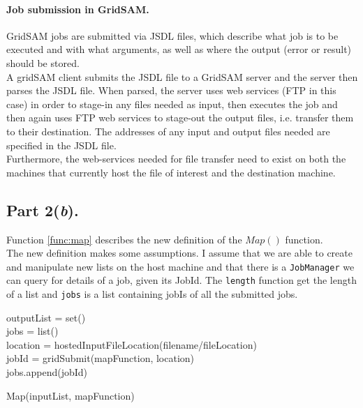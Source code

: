 \documentclass[12pt,a4paper,onecolumn]{article}
\begin{document}
\paragraph{Job submission in GridSAM.} GridSAM jobs are submitted via JSDL files, which describe what job is to be executed and with what arguments, as well as where the output (error or result) should be stored.\\

A gridSAM client submits the JSDL file to a GridSAM server and the server then parses the JSDL file. When parsed, the server uses web services (FTP in this case) in order to stage-in any files needed as input, then executes the job and then again uses FTP web services to stage-out the output files, i.e. transfer them to their destination. The addresses of any input and output files needed are specified in the JSDL file.\\

Furthermore, the web-services needed for file transfer need to exist on both the machines that currently host the file of interest and the destination machine.

\subsection{Part 2(\textit{b}).} Function \ref{func:map} describes the new definition of the $Map()$ function. \\

The new definition makes some assumptions. I assume that we are able to create and manipulate new lists on the host machine and that there is a \texttt{JobManager} we can query for details of a job, given its JobId. The \texttt{length} function get the length of a list and  \texttt{jobs} is a list containing jobIs of all the submitted jobs.\\

\vspace{0.5cm}
\begin{function}[H]
	outputList = set()\\
	jobs = list()\\
	 {
		location = hostedInputFileLocation(filename/fileLocation)\\
		jobId = gridSubmit(mapFunction, location)\\
		jobs.append(jobId)\\
	}
	
\caption{Map(inputList, mapFunction)}
\label{func:map}
\end{function}
\vspace{0.5cm}
\end{document}
